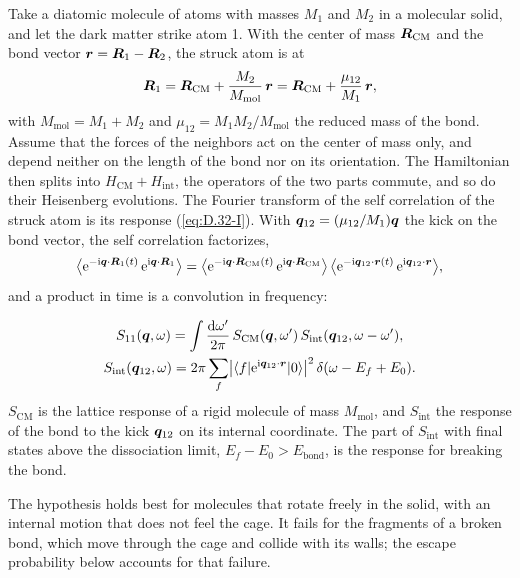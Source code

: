 Take a diatomic molecule of atoms with masses $M_1$ and $M_2$ in a molecular solid, and let the dark matter strike atom 1. With the center of mass $\bm{R}_{\mathrm{CM}}$ and the bond vector $\bm{r} = \bm{R}_1 - \bm{R}_2$, the struck atom is at
\begin{equation*}
  \bm{R}_1 = \bm{R}_{\mathrm{CM}} + \frac{M_2}{M_{\mathrm{mol}}}\,\bm{r} = \bm{R}_{\mathrm{CM}} + \frac{\mu_{12}}{M_1}\,\bm{r} ,
\end{equation*}
with $M_{\mathrm{mol}} = M_1 + M_2$ and $\mu_{12} = M_1M_2/M_{\mathrm{mol}}$ the reduced mass of the bond. Assume that the forces of the neighbors act on the center of mass only, and depend neither on the length of the bond nor on its orientation. The Hamiltonian then splits into $H_{\mathrm{CM}} + H_{\mathrm{int}}$, the operators of the two parts commute, and so do their Heisenberg evolutions. The Fourier transform of the self correlation of the struck atom is its response (\cref{eq:D.32-I}). With $\bm{q}_{12} = (\mu_{12}/M_1)\bm{q}$ the kick on the bond vector, the self correlation factorizes,
\begin{equation*}
  \bigl\langle\mathrm{e}^{-\mathrm{i}\bm{q}\cdot\bm{R}_1(t)}\,\mathrm{e}^{\mathrm{i}\bm{q}\cdot\bm{R}_1}\bigr\rangle = \bigl\langle\mathrm{e}^{-\mathrm{i}\bm{q}\cdot\bm{R}_{\mathrm{CM}}(t)}\,\mathrm{e}^{\mathrm{i}\bm{q}\cdot\bm{R}_{\mathrm{CM}}}\bigr\rangle\,\bigl\langle\mathrm{e}^{-\mathrm{i}\bm{q}_{12}\cdot\bm{r}(t)}\,\mathrm{e}^{\mathrm{i}\bm{q}_{12}\cdot\bm{r}}\bigr\rangle ,
\end{equation*}
and a product in time is a convolution in frequency:
\begin{keyresult}
\begin{equation}
  \begin{gathered}
  S_{11}(\bm{q},\omega) = \int\frac{\mathrm{d}\omega'}{2\pi}\,S_{\mathrm{CM}}(\bm{q},\omega')\,S_{\mathrm{int}}(\bm{q}_{12},\omega - \omega') , \\
  S_{\mathrm{int}}(\bm{q}_{12},\omega) = 2\pi\sum_f\bigl|\langle f|\mathrm{e}^{\mathrm{i}\bm{q}_{12}\cdot\bm{r}}|0\rangle\bigr|^2\,\delta(\omega - E_f + E_0) .
  \end{gathered}
  \label{eq:16.6-conv}
\end{equation}
$S_{\mathrm{CM}}$ is the lattice response of a rigid molecule of mass $M_{\mathrm{mol}}$, and $S_{\mathrm{int}}$ the response of the bond to the kick $\bm{q}_{12}$ on its internal coordinate. The part of $S_{\mathrm{int}}$ with final states above the dissociation limit, $E_f - E_0 > E_{\mathrm{bond}}$, is the response for breaking the bond.
\end{keyresult}
\noindent The hypothesis holds best for molecules that rotate freely in the solid, with an internal motion that does not feel the cage. It fails for the fragments of a broken bond, which move through the cage and collide with its walls; the escape probability below accounts for that failure.

